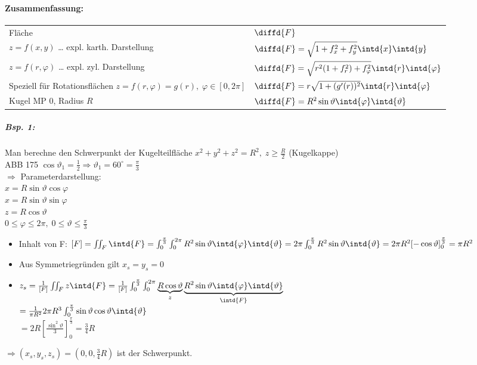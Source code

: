 \paragraph{Zusammenfassung:}\parskp
\begin{tabular}{L{0.5} | L{0.4}}
Fläche & $\diffd{F}$\\
$z=f(x,y)$ … expl. karth. Darstellung & $\diffd{F}=\sqrt{1+f_x^2+f_y^2}\intd{x}\intd{y}$\\
$z=f(r,\varphi)$ … expl. zyl. Darstellung & $\diffd{F}=\sqrt{r^2(1+f_r^2)+f_\varphi^2}\intd{r}\intd{\varphi}$\\
Speziell für Rotationsflächen $z=f(r,\varphi)=g(r), \; \varphi \in [0,2\pi]$ & $\diffd{F}=r\sqrt{1+(g'(r))^2}\intd{r}\intd{\varphi}$\\
Kugel MP $0$, Radius $R$ & $\diffd{F}=R^2\sin \vartheta \intd{\varphi}\intd{\vartheta}$
\end{tabular}
\subparagraph{Bsp. 1:} Man berechne den Schwerpunkt der Kugelteilfläche $x^2+y^2+z^2=R^2, \; z\geq \frac{R}{2}$ (Kugelkappe)\\
ABB 175
$\cos \vartheta_1=\frac{1}{2}\Rightarrow \vartheta_1=60^\circ = \frac{\pi}{3}$
\\
$\Rightarrow $ Parameterdarstellung:\\
$x=R \sin\vartheta \cos \varphi$\\
$x=R \sin\vartheta \sin \varphi$\\
$z=R\cos \vartheta$\\
$0\leq \varphi \leq 2\pi,\; 0 \leq \vartheta \leq \frac{\pi}{3}$
\begin{itemize}
\item Inhalt von F: $[F]=\iint_F \intd{F}=\int_0^{\frac{\pi}{3}}\int_0^{2\pi}R^2\sin\vartheta\intd{\varphi}\intd{\vartheta}\\
=2\pi\int_0^{\frac{\pi}{3}}R^2\sin\vartheta \intd{\vartheta}=2\pi R^2[-\cos\vartheta]_0^{\frac{\pi}{3}}=\pi R^2$
\item Aus Symmetriegründen gilt $x_s=y_s=0$
\item $z_s=\frac{1}{[F]}\iint_F z \intd{F}=\frac{1}{[F]}\int_0^{\frac{\pi}{3}}\int_0^{2\pi}\underbrace{R \cos \vartheta}_{z} \underbrace{R^2 \sin \vartheta \intd{\varphi}\intd{\vartheta}}_{\intd{F}}$\\
$=\frac{1}{\pi R^2}2\pi R^3\int_0^{\frac{\pi}{3}}\sin\vartheta \cos \vartheta\intd{\vartheta}$\\
$=2R\left[\frac{\sin^2\vartheta}{3}\right]_0^{\frac{\pi}{3}}=\frac{3}{4}R$
\end{itemize}
$\Rightarrow (x_s,y_s,z_s)=\left(0,0,\frac{3}{4}R\right)$ ist der Schwerpunkt.

